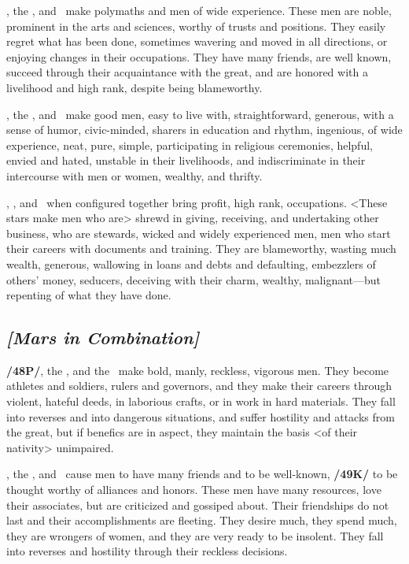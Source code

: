 \Mercury, the \Sun, and \Venus\, make polymaths and men of wide experience. These men are noble, prominent in the arts and sciences, worthy of trusts and positions. They easily regret what has been done, sometimes wavering and moved in all directions, or enjoying changes in their occupations. They have many friends, are well known, succeed through their acquaintance with the great, and are honored with a livelihood and high rank, despite being blameworthy.

\Mercury, the \Moon, and \Venus\, make good men, easy to live with, straightforward, generous, with a sense of humor, civic-minded, sharers in education and rhythm, ingenious, of wide experience, neat, pure, simple, participating in religious ceremonies, helpful, envied and hated, unstable in their livelihoods, and indiscriminate in their intercourse with men or women, wealthy, and thrifty.

\Mercury, \Mars, and \Venus\, when configured together bring profit, high rank, occupations. <These stars make men who are> shrewd in giving, receiving, and undertaking other business, who are stewards, wicked and widely experienced men, men who start their careers with documents and training. They are blameworthy, wasting much wealth, generous, wallowing in loans and debts and defaulting, embezzlers of others’ money, seducers, deceiving with their charm, wealthy, malignant—but repenting of what they have done.

\secbr
{}
\subsection{\textit{[Mars in Combination]}}
\textbf{/48P/}\Mars, the \Sun, and the \Moon\, make bold, manly, reckless, vigorous men. They become athletes and soldiers, rulers and governors, and they make their careers through violent, hateful deeds, in laborious crafts, or in work in hard materials. They fall into reverses and into dangerous situations, and suffer hostility and attacks from the great, but if benefics are in aspect, they maintain the basis <of their nativity> unimpaired.

\Mars, the \Sun, and \Venus\, cause men to have many friends and to be well-known, \textbf{/49K/} to be thought
worthy of alliances and honors. These men have many resources, love their associates, but are criticized and gossiped about. Their friendships do not last and their accomplishments are fleeting. They desire much, they spend much, they are wrongers of women, and they are very ready to be insolent. They fall
into reverses and hostility through their reckless decisions.

